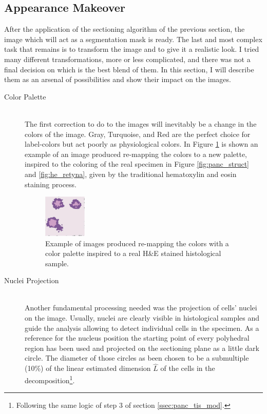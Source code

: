 \subsection{Appearance Makeover} \label{ssec:app_mkov}
    After the application of the sectioning algorithm of the previous section, the image which will act as a segmentation mask is ready. The last and most complex task that remains is to transform the image and to give it a realistic look. I tried many different transformations, more or less complicated, and there was not a final decision on which is the best blend of them. In this section, I will describe them as an arsenal of possibilities and show their impact on the images.

    \begin{description}
        \item [Color Palette] \hfill \\
        The first correction to do to the images will inevitably be a change in the colors of the image. Gray, Turquoise, and Red are the perfect choice for label-colors but act poorly as physiological colors. In Figure \ref{fig:new_palette} is shown an example of an image produced re-mapping the colors to a new palette, inspired to the coloring of the real specimen in Figure \ref{fig:panc_struct} and \ref{fig:he_retyna}, given by the traditional hematoxylin and eosin staining process.

        \begin{figure}[h]
            \centering
            \includegraphics[width = 0.2\textwidth]{images/new_palette}
            \caption{Example of images produced re-mapping the colors with a color palette inspired to a real H\&E stained histological sample.}
            \label{fig:new_palette}
        \end{figure}

        \item [Nuclei Projection] \hfill \\
        Another fundamental processing needed was the projection of cells' nuclei on the image. Usually, nuclei are clearly visible in histological samples and guide the analysis allowing to detect individual cells in the specimen. As a reference for the nucleus position the starting point of every polyhedral region has been used and projected on the sectioning plane as a little dark circle. The diameter of those circles as been chosen to be a submultiple (10\%) of the linear estimated dimension $\hat{L}$ of the cells in the decomposition\footnote{Following the same logic of step 3 of section \ref{ssec:panc_tis_mod}.}.


\end{description}
